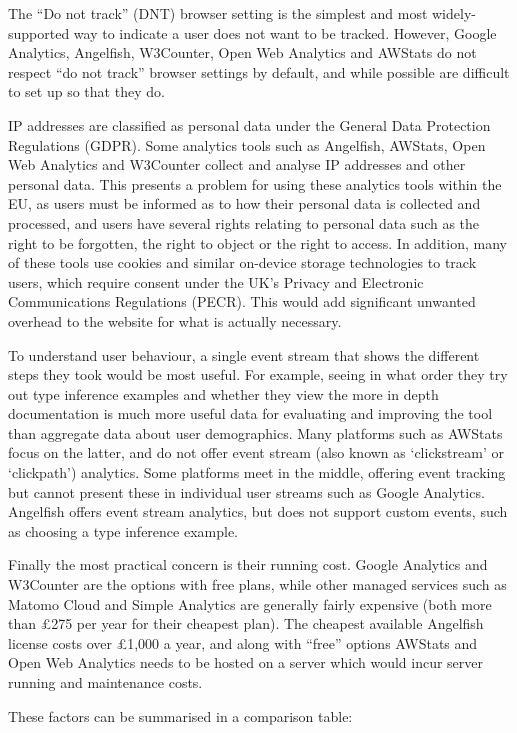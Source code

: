\documentclass[a4paper,fleqn,12pt]{article}
\begin{document}
The “Do not track” (DNT) browser setting is the simplest and most widely-supported way to indicate a user does not want to be tracked. However, Google Analytics, Angelfish, W3Counter, Open Web Analytics and AWStats do not respect “do not track” browser settings by default, and while possible are difficult to set up so that they do.

IP addresses are classified as personal data under the General Data Protection Regulations (GDPR). Some analytics tools such as Angelfish, AWStats, Open Web Analytics and W3Counter collect and analyse IP addresses and other personal data. This presents a problem for using these analytics tools within the EU, as users must be informed as to how their personal data is collected and processed, and users have several rights relating to personal data such as the right to be forgotten, the right to object or the right to access. In addition, many of these tools use cookies and similar on-device storage technologies to track users, which require consent under the UK’s Privacy and Electronic Communications Regulations (PECR). This would add significant unwanted overhead to the website for what is actually necessary.

To understand user behaviour, a single event stream that shows the different steps they took would be most useful. For example, seeing in what order they try out type inference examples and whether they view the more in depth documentation is much more useful data for evaluating and improving the tool than aggregate data about user demographics. Many platforms such as AWStats focus on the latter, and do not offer event stream (also known as ‘clickstream’ or ‘clickpath’) analytics. Some platforms meet in the middle, offering event tracking but cannot present these in individual user streams such as Google Analytics. Angelfish offers event stream analytics, but does not support custom events, such as choosing a type inference example.

Finally the most practical concern is their running cost. Google Analytics and W3Counter are the options with free plans, while other managed services such as Matomo Cloud and Simple Analytics are generally fairly expensive (both more than £275 per year for their cheapest plan). The cheapest available Angelfish license costs over £1,000 a year, and along with “free” options AWStats and Open Web Analytics needs to be hosted on a server which would incur server running and maintenance costs.

These factors can be summarised in a comparison table:
\end{document}
